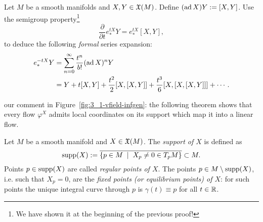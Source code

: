 \begin{exercise}
  Let $M$ be a smooth manifolds and $X,Y\in\mathfrak{X}(M)$.
  Define $(\operatorname{ad} X) Y := [X,Y]$.
  Use the semigroup property\footnote{We have shown it at the beginning of the previous proof!}
  \begin{equation}
    \frac{\partial}{\partial t} e_*^{tX} Y = e_*^{tX}[X,Y],
  \end{equation}
  to deduce the following \emph{formal} series expansion:
  \begin{align}
    e_*^{-tX} Y
    &= \sum_{n=0}^\infty \frac{t^n}{b!}(\operatorname{ad} X)^n Y \\
    &= Y + t[X,Y] + \frac{t^2}{2}[X, [X, Y]] + \frac{t^3}{6} [X,[X,[X,Y]]] + \cdots.
  \end{align}
\end{exercise}

 our comment in Figure~\ref{fig:3_1-vfield-infgen}: the following theorem shows that every flow $\varphi^X$ admits local coordinates on its support which map it into a linear flow.

\begin{definition}
  Let $M$ be a smooth manifold and $X\in\mathfrak{X}(M)$. 
  The \emph{support of $X$} is defined as
  \begin{equation}
    \operatorname{supp}(X):=\overline{\left\lbrace p\in M \;\mid\; X_p\neq 0 \in T_p M\right\rbrace}\subset M.
  \end{equation}
  Points $p\in\operatorname{supp}(X)$ are called \emph{regular points of $X$}.
  The points $p\in M\setminus\operatorname{supp}(X)$, i.e. such that $X_p = 0$, are the \emph{fixed points (or equilibrium points) of $X$}: for such points the unique integral curve through $p$ is $\gamma(t) \equiv p$ for all $t\in\mathbb{R}$. 
\end{definition}

